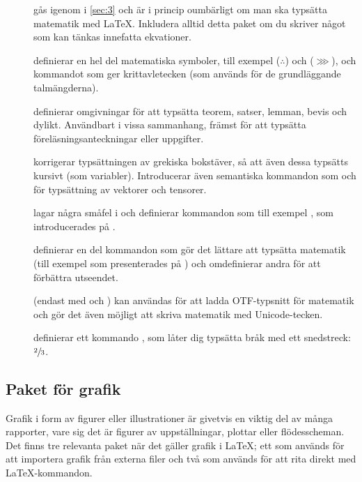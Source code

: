 \documentclass[10pt,../../a4.tex]{subfiles}
\begin{document}
\begin{description}
	\item[]
	gås igenom i \cref{sec:3} och är i princip oumbärligt om man ska
	typsätta matematik med \LaTeX. Inkludera alltid detta paket om du
	skriver något som kan tänkas innefatta ekvationer.

	\item[]
	definierar en hel del matematiska symboler, till exempel 
	 (\(\therefore\)) och  (\(\ggg\)), och 
	kommandot  som ger krittavletecken (som
	används för de grundläggande talmängderna).
	
	\item[]
	definierar omgivningar för att typsätta teorem, satser, lemman, bevis
	och dylikt. Användbart i vissa sammanhang, främst för att typsätta
	föreläsningsanteckningar eller uppgifter. 
	
	\item[{}]
	korrigerar typsättningen av grekiska bokstäver, så att även dessa typsätts
	kursivt (som variabler). Introducerar även semantiska kommandon som
	 och  för typsättning av vektorer
	och tensorer.
	
	\item[]
	lagar några småfel i  och definierar kommandon som till
	exempel , som introducerades på
	.

	\item[]
	definierar en del kommandon som gör det lättare att typsätta matematik
	(till exempel  som presenterades på )
	och omdefinierar andra för att förbättra utseendet.

	\item[{}]
		(endast med \XeTeX{} och )
	kan användas för att ladda \textsc{OTF}-typsnitt för matematik och
	gör det även möjligt att skriva matematik med Unicode-tecken.

	\item[{}]
	definierar ett kommando , som låter dig typsätta bråk
	med ett snedstreck: \(\sfrac{2}{3}\).
\end{description}

\subsection{Paket för grafik}
Grafik i form av figurer eller illustrationer är givetvis en viktig del
av många rapporter, vare sig det är figurer av uppställningar, plottar
eller flödesscheman. Det finns tre relevanta paket när det gäller grafik
i \LaTeX; ett som används för att importera grafik från externa filer och
två som används för att rita direkt med \LaTeX-kommandon.
\end{document}
